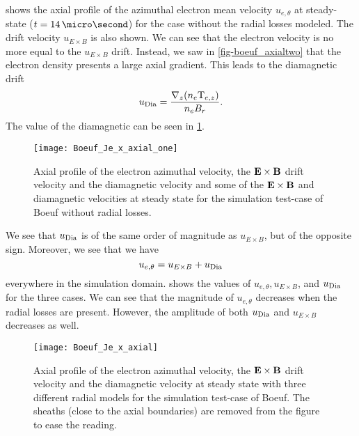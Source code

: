    shows the axial profile of the azimuthal electron mean velocity $u_{e, \theta}$ at steady-state ($t = 14\,\micro\second$) for the case without the radial losses modeled.
  The drift velocity $u_{E \times B}$ is also shown.
  We can see that the electron velocity is no more equal to the $u_{E \times B}$ drift.
  Instead, we saw in \cref{fig-boeuf_axialtwo} that the electron density presents a large axial gradient.
  This leads to the diamagnetic drift
  $$u_{\rm Dia}=\frac{\nabla_z (n_e {\rm T}_{e,z})}{n_e B_r}.$$
  The value of the diamagnetic can be seen in \cref{fig-Jetheta_sum}.


  \begin{figure}[hbt]
    \centering
    \texttt{[image: Boeuf\_Je\_x\_axial\_one]}
    \caption{Axial profile of the electron azimuthal velocity, the ${\mathbf E} \times {\mathbf B}$ drift velocity and the diamagnetic velocity and some of the ${\mathbf E} \times {\mathbf B}$ and diamagnetic velocities at steady state for the simulation test-case of Boeuf without radial losses.}
    \label{fig-Jetheta_sum}
  \end{figure}


  We see that $u_{\rm Dia}$ is of the same order of magnitude as $u_{E \times B}$, but of the opposite sign.
  Moreover, we see that we have 
  $$ u_{e, \theta} =   u_{E \times B} + u_{\rm Dia}$$
  everywhere in the simulation domain.
   shows the values of $ u_{e, \theta},   u_{E \times B}$, and $u_{\rm Dia}$ for the three cases.
  We can see that the magnitude of $u_{e, \theta} $ decreases when the radial losses are present.
  However, the amplitude of both $u_{\rm Dia}$ and $u_{E \times B}$ decreases as well.

   
  \begin{figure}[hbt]
    \centering
    \texttt{[image: Boeuf\_Je\_x\_axial]}
    \caption{Axial profile of the electron azimuthal velocity, the ${\mathbf E} \times {\mathbf B}$ drift velocity and the diamagnetic velocity at steady state with three different radial models for the simulation test-case of Boeuf. The sheaths (close to the axial boundaries) are removed from the figure to ease the reading.}
    \label{fig-Jetheta}
  \end{figure}


